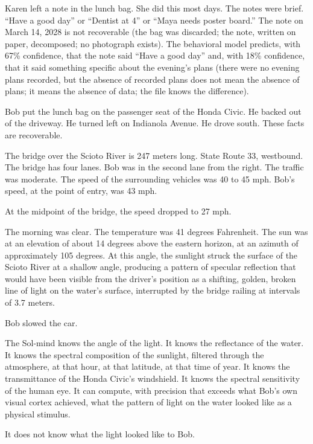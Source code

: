 \bigskip

Karen left a note in the lunch bag. She did this most days. The notes were brief. ``Have a good day'' or ``Dentist at 4'' or ``Maya needs poster board.'' The note on March 14, 2028 is not recoverable (the bag was discarded; the note, written on paper, decomposed; no photograph exists). The behavioral model predicts, with 67\% confidence, that the note said ``Have a good day'' and, with 18\% confidence, that it said something specific about the evening's plans (there were no evening plans recorded, but the absence of recorded plans does not mean the absence of plans; it means the absence of data; the file knows the difference).

Bob put the lunch bag on the passenger seat of the Honda Civic. He backed out of the driveway. He turned left on Indianola Avenue. He drove south. These facts are recoverable.

\bigskip

The bridge over the Scioto River is 247 meters long. State Route 33, westbound. The bridge has four lanes. Bob was in the second lane from the right. The traffic was moderate. The speed of the surrounding vehicles was 40 to 45 mph. Bob's speed, at the point of entry, was 43 mph.

At the midpoint of the bridge, the speed dropped to 27 mph.

The morning was clear. The temperature was 41 degrees Fahrenheit. The sun was at an elevation of about 14 degrees above the eastern horizon, at an azimuth of approximately 105 degrees. At this angle, the sunlight struck the surface of the Scioto River at a shallow angle, producing a pattern of specular reflection that would have been visible from the driver's position as a shifting, golden, broken line of light on the water's surface, interrupted by the bridge railing at intervals of 3.7 meters.

Bob slowed the car.

The Sol-mind knows the angle of the light. It knows the reflectance of the water. It knows the spectral composition of the sunlight, filtered through the atmosphere, at that hour, at that latitude, at that time of year. It knows the transmittance of the Honda Civic's windshield. It knows the spectral sensitivity of the human eye. It can compute, with precision that exceeds what Bob's own visual cortex achieved, what the pattern of light on the water looked like as a physical stimulus.

It does not know what the light looked like to Bob.

